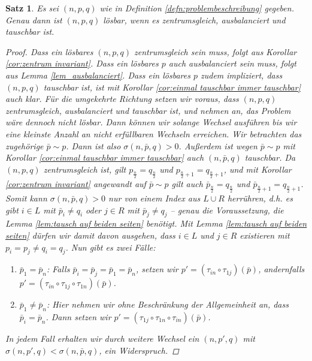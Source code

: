 \documentclass[12pt]{article}
\newtheorem{thm}{Satz} %
\begin{document}
\begin{thm}
Es sei $(n, p, q)$ wie in Definition \ref{defn:problembeschreibung} gegeben. Genau dann ist $(n, p, q)$ lösbar, wenn es zentrumsgleich, ausbalanciert und tauschbar ist.
\begin{proof}
Dass ein lösbares $(n,p,q)$ zentrumsgleich sein muss, folgt aus Korollar \ref{cor:zentrum invariant}. Dass ein lösbares $p$ auch ausbalanciert sein muss, folgt aus Lemma \ref{lem_ausbalanciert}. Dass ein lösbares $p$ zudem impliziert, dass $(n, p, q)$ tauschbar ist, ist mit Korollar \ref{cor:einmal tauschbar immer tauschbar} auch klar. Für die umgekehrte Richtung setzen wir voraus, dass $(n,p,q)$ zentrumsgleich, ausbalanciert und tauschbar ist, und nehmen an, das Problem wäre dennoch nicht lösbar. Dann können wir solange Wechsel ausführen bis wir eine kleinste Anzahl an nicht erfüllbaren Wechseln erreichen. Wir betrachten das zugehörige $\bar{p}\sim p$. Dann ist also $\sigma(n, \bar{p}, q)>0$. Außerdem ist wegen $\bar{p}\sim p$ mit Korollar \ref{cor:einmal tauschbar immer tauschbar} auch $(n, \bar{p}, q)$ tauschbar.
Da $(n,p,q)$ zentrumsgleich ist, gilt $p_{\frac{n}{2}}=q_{\frac{n}{2}}$ und $p_{\frac{n}{2}+1}=q_{\frac{n}{2}+1}$, und mit Korollar \ref{cor:zentrum invariant} angewandt auf $\bar p\sim p$ gilt auch $\bar p_{\frac{n}{2}}=q_{\frac{n}{2}}$ und $\bar p_{\frac{n}{2}+1}=q_{\frac{n}{2}+1}$. Somit kann $\sigma(n,\bar p, q)>0$ nur von einem Index aus $L\cup R$ herrühren, d.h. es gibt $i\in L$ mit $\bar p_i\neq q_i$ oder $j\in R$ mit $\bar p_j\neq q_j$ -- genau die Voraussetzung, die Lemma \ref{lem:tausch auf beiden seiten} benötigt.
Mit Lemma \ref{lem:tausch auf beiden seiten} dürfen wir damit davon ausgehen, dass  $i\in L$ und $j\in R$ existieren mit $p_i=p_j\neq q_i=q_j$.
Nun gibt es zwei Fälle:
\begin{enumerate}
 \item $\bar{p}_1 = \bar{p}_n$: Falls $\bar{p}_i=\bar{p}_j=\bar{p}_1=\bar{p}_n$, setzen wir $p'=(\tau_{in}\circ\tau_{1j})(\bar{p})$, andernfalls $p'=(\tau_{in}\circ\tau_{1j}\circ\tau_{1n})(\bar{p})$.
 \item $\bar{p}_1 \neq \bar{p}_n$: Hier nehmen wir ohne Beschränkung der Allgemeinheit an, dass $\bar{p}_i=\bar{p}_n$. Dann setzen wir $p'=(\tau_{1j}\circ\tau_{1n}\circ\tau_{in})(\bar{p})$.
\end{enumerate}
In jedem Fall erhalten wir durch weitere Wechsel ein $(n, p', q)$ mit $\sigma(n, p', q)<\sigma(n, \bar{p}, q)$,  ein Widerspruch.
\end{proof}
\label{thm}
\end{thm}
\end{document}

